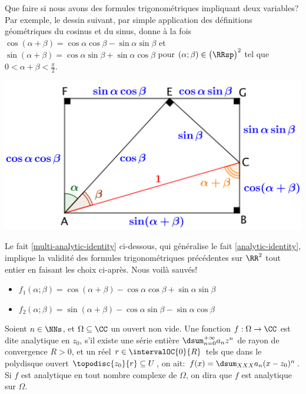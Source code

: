 Que faire si nous avons des formules trigonométriques impliquant deux variables? Par exemple, le dessin suivant, par simple application des définitions géométriques du cosinus et du sinus, donne à la fois
$\cos(\alpha + \beta) = \cos \alpha \cos \beta - \sin \alpha \sin \beta$
et
$\sin(\alpha + \beta) = \cos \alpha \sin \beta + \sin \alpha \cos \beta$
pour
$(\alpha ; \beta) \in \big( \RRsp \big)^2$ tel que $0 < \alpha + \beta < \frac{\pi}{2}$. 

\begin{center}
	\includegraphics[scale=.7]{two-var-trig-formulas.png}
\end{center}

Le fait \ref{multi-analytic-identity} ci-dessous, qui généralise le fait \ref{analytic-identity}, implique la validité des formules trigonométriques précédentes sur $\RR^2$ tout entier en faisant les choix ci-après.
Nous voilà sauvés!
%
\begin{itemize}[label=\small\textbullet]
	\item $f_1(\alpha ; \beta) = \cos(\alpha + \beta) - \cos \alpha \cos \beta + \sin \alpha \sin \beta$

	\item $f_2(\alpha ; \beta) = \sin(\alpha + \beta) - \cos \alpha \sin \beta - \sin \alpha \cos \beta$
\end{itemize}






\begin{defi}
    Soient $n \in \NNs$, et $\Omega \subseteq \CC$ un ouvert non vide.
	Une fonction $f: \Omega \rightarrow \CC$ est dite analytique en $z_0$, 
	s'il existe
	une série entière $\dsum_{n = 0}^{+\infty} a_n z^n$
	de rayon de convergence $R > 0$,
	et
	un réel $r \in \intervalOC{0}{R}$ tels que dans le polydisque ouvert $\topodisc{z_0}{r} \subseteq U$, on ait:
	$f(x) = \dsum_{XXX} a_n (x - z_0)^n$.
	Si $f$ est analytique en tout nombre complexe de $\Omega$, on dira que $f$ est analytique sur $\Omega$.
\end{defi}



